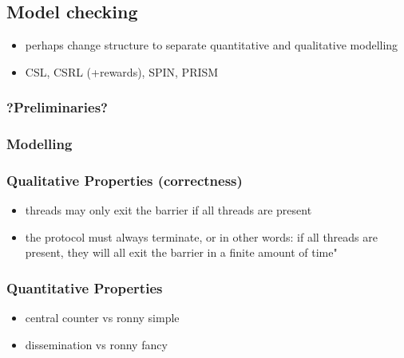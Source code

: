 \documentclass[a4paper, 10pt]{article}
\begin{document}
\subsection{Model checking}
\begin{itemize}
	\item perhaps change structure to separate quantitative and qualitative modelling
	\item CSL\cite{assb96}, CSRL\cite{bhhk00} (+rewards), SPIN\cite{spin}\cite{hol97}, PRISM\cite{prism}\cite{knp09}
\end{itemize}
\subsubsection{?Preliminaries?}
\subsubsection{Modelling} %
\subsubsection{Qualitative Properties (correctness)}
\begin{itemize}
	\item threads may only exit the barrier if all threads are present
	\item the protocol must always terminate, or in other words: if all threads are present, they will all exit the barrier in a finite amount of time"
\end{itemize}
\subsubsection{Quantitative Properties}
\begin{itemize}
	\item central counter vs ronny simple
	\item dissemination vs ronny fancy
\end{itemize}

\end{document}

